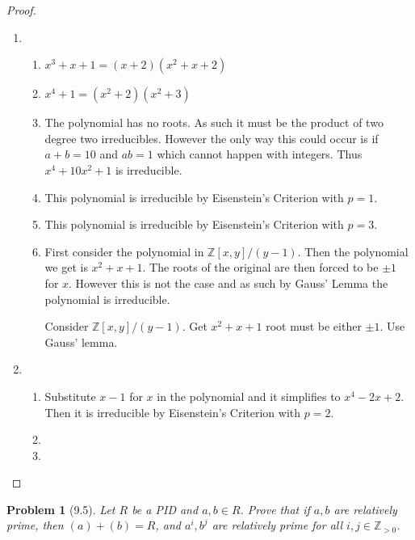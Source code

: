 \documentclass[10pt]{article}
\newcommand{\sk}{\vskip 10mm}
\newcommand{\bb}[1]{\mathbb{#1}}
\theoremstyle{plain}
\newtheorem{problem}{Problem}
\theoremstyle{remark}
\begin{document}
\begin{proof}
  \begin{enumerate}
  \item
    \begin{enumerate}
    \item $x^3+x+1=(x+2)(x^2+x+2)$
    \item $x^4+1=(x^2+2)(x^2+3)$
    \item The polynomial has no roots. As such it must be the product of two
      degree two irreducibles. However the only way this could occur is
      if $a+b=10$ and $ab=1$ which cannot happen with integers.
      Thus $x^4+10x^2+1$ is irreducible.
    \item This polynomial is irreducible by Eisenstein's Criterion with
      $p=1$.
    \item This polynomial is irreducible by Eisenstein's Criterion with
      $p=3$.
    \item First consider the polynomial in $\bb{Z}[x,y]/(y-1)$. Then the
      polynomial we get is $x^2+x+1$. The roots of the original are then
      forced to be $\pm 1$ for $x$. However this is not the case and as
      such by Gauss' Lemma the polynomial is irreducible.

      Consider $\bb{Z}[x,y]/(y-1)$. Get $x^2+x+1$ root must be either $\pm 1$.
      Use Gauss' lemma.
    \end{enumerate}
  \item
    \begin{enumerate}
    \item Substitute $x-1$ for $x$ in the polynomial and it simplifies to
      $x^4-2x+2$. Then it is irreducible by Eisenstein's Criterion with $p=2$.
    \item 
    \item 
    \end{enumerate}

  \end{enumerate}
  \end{proof}

\sk


\begin{problem}[9.5]
  Let $R$ be a PID and $a,b\in R$. Prove that if $a,b$ are relatively
  prime, then $(a)+(b)=R$, and $a^i,b^j$ are relatively prime for all
  $i,j\in\bb{Z}_{>0}$.
\end{problem}
\end{document}
